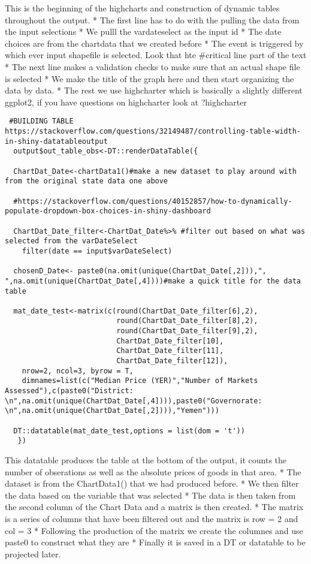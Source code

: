 \documentclass[
]{article}
\begin{document}
This is the beginning of the highcharts and construction of dynamic
tables throughout the output. * The first line has to do with the
pulling the data from the input selections * We pulll the vardateselect
as the input id * The date choices are from the chartdata that we
created before * The event is triggered by which ever input shapefile is
selected. Look that hte \#critical line part of the text * The next line
makes a validation checks to make sure that an actual shape file is
selected * We make the title of the graph here and then start organizing
the data by data. * The rest we use highcharter which is basically a
slightly different ggplot2, if you have questions on highcharter look at
?highcharter

\begin{verbatim}
 #BUILDING TABLE  https://stackoverflow.com/questions/32149487/controlling-table-width-in-shiny-datatableoutput
  output$out_table_obs<-DT::renderDataTable({
    
  ChartDat_Date<-chartData1()#make a new dataset to play around with from the original state data one above
  
  #https://stackoverflow.com/questions/40152857/how-to-dynamically-populate-dropdown-box-choices-in-shiny-dashboard
  
  ChartDat_Date_filter<-ChartDat_Date%>% #filter out based on what was selected from the varDateSelect
    filter(date == input$varDateSelect)
  
  chosenD_Date<- paste0(na.omit(unique(ChartDat_Date[,2])),", ",na.omit(unique(ChartDat_Date[,4])))#make a quick title for the data table
  
  mat_date_test<-matrix(c(round(ChartDat_Date_filter[6],2),
                          round(ChartDat_Date_filter[8],2),
                          round(ChartDat_Date_filter[9],2),
                          ChartDat_Date_filter[10],
                          ChartDat_Date_filter[11],
                          ChartDat_Date_filter[12]), 
    nrow=2, ncol=3, byrow = T,
    dimnames=list(c("Median Price (YER)","Number of Markets Assessed"),c(paste0("District: \n",na.omit(unique(ChartDat_Date[,4]))),paste0("Governorate: \n",na.omit(unique(ChartDat_Date[,2]))),"Yemen")))
  
  DT::datatable(mat_date_test,options = list(dom = 't'))
   })
\end{verbatim}

This datatable produces the table at the bottom of the output, it counts
the number of obserations as well as the absolute prices of goods in
that area. * The dataset is from the ChartData1() that we had produced
before. * We then filter the data based on the variable that was
selected * The data is then taken from the second column of the Chart
Data and a matrix is then created. * The matrix is a series of columns
that have been filtered out and the matrix is row = 2 and col = 3 *
Following the production of the matrix we create the columnes and use
paste0 to construct what they are * Finally it is saved in a DT or
datatable to be projected later.
\end{document}
